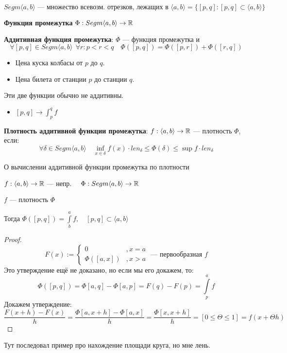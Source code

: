 $$Segm\langle a,b\rangle \text{ --- множество всевозм. отрезков, лежащих в } \langle a,b\rangle = \{[p, q] : [p,q]\subset\langle a,b\rangle\}$$
\begin{definition}
    \textbf{Функция промежутка} $\Phi : Segm\langle a,b\rangle \to \mathbb{R}$
\end{definition}
\begin{definition}

    \textbf{Аддитивная функция промежутка}: $\Phi$ --- функция промежутка и
    $$\forall [p,q]\in Segm\langle a,b\rangle \ \ \forall r : p < r < q \quad \Phi([p,q])=\Phi([p,r])+\Phi([r,q])$$
\end{definition}
\begin{example}
    \begin{itemize}
        \item Цена куска колбасы от $p$ до $q$.
        \item Цена билета от станции $p$ до станции $q$.
    \end{itemize}
    Эти две функции обычно не аддитивны.
    \begin{itemize}
        \item $[p,q]\to\int_p^q f$
    \end{itemize}
\end{example}

\begin{definition}
    \textbf{Плотность аддитивной функции промежутка}: $f:\langle a,b\rangle \to\mathbb{R}$ --- плотность $\Phi$, если:
    $$\forall \delta\in Segm\langle a,b\rangle \quad \inf\limits_{x\in\delta} f(x)\cdot len_\delta\leq \Phi(\delta)\leq\sup f \cdot len_\delta$$
\end{definition}

\begin{theorem}
    О вычислении аддитивной функции промежутка по плотности

    $f:\langle a,b\rangle \to \mathbb{R}$ --- непр. $\quad \Phi : Segm\langle a,b\rangle\to\mathbb{R}$

    $f$ --- плотность $\Phi$

    Тогда $\Phi([p,q])=\int\limits_b^a f, \quad [p,q]\subset \langle a,b\rangle$
\end{theorem}
\begin{proof}
    $$F(x):=\begin{cases}
        0 &, x=a \\
        \Phi([a,x]) &, x>a
    \end{cases} \text{ --- первообразная } f$$
    Это утверждение ещё не доказано, но если мы его докажем, то:
    $$\Phi([p,q])=\Phi[a,q]-\Phi[a,p]=F(q)-F(p)=\int\limits_p^af$$
    Докажем утверждение:
    $$\frac{F(x+h)-F(x)}{h}=\frac{\Phi[a,x+h]-\Phi[a,x]}{h}=\frac{\Phi[x,x+h]}{h}=[0\leq\Theta\leq1]=f(x+\Theta h)$$
\end{proof}

Тут последовал пример про нахождение площади круга, но мне лень.

